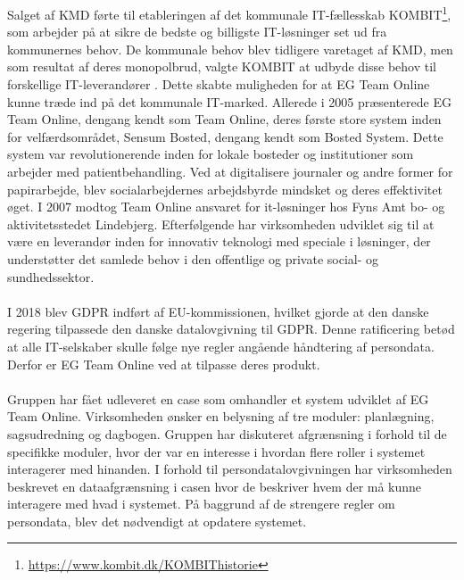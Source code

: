 Salget af KMD førte til etableringen af det kommunale IT-fællesskab KOMBIT\footnote{\url{ https://www.kombit.dk/KOMBIThistorie}}, som arbejder på at sikre de bedste og billigste IT-løsninger set ud fra kommunernes behov. De kommunale behov blev tidligere varetaget af KMD, men som resultat af deres monopolbrud, valgte KOMBIT at udbyde disse behov til forskellige IT-leverandører . Dette skabte muligheden for at EG Team Online kunne træde ind på det kommunale IT-marked.
Allerede i 2005 præsenterede EG Team Online, dengang kendt som Team Online, deres første store system inden for velfærdsområdet, Sensum Bosted, dengang kendt som Bosted System. Dette system var revolutionerende inden for lokale bosteder og institutioner som arbejder med patientbehandling. Ved at digitalisere journaler og andre former for papirarbejde, blev socialarbejdernes arbejdsbyrde mindsket og deres effektivitet øget. I 2007 modtog Team Online ansvaret for it-løsninger hos Fyns Amt bo- og aktivitetsstedet Lindebjerg. Efterfølgende har virksomheden udviklet sig til at være en leverandør inden for innovativ teknologi med speciale i løsninger, der understøtter det samlede behov i den offentlige og private social- og sundhedssektor.\\ \\
I 2018 blev GDPR indført af EU-kommissionen, hvilket gjorde at den danske regering tilpassede den danske datalovgivning til GDPR. Denne ratificering betød at alle IT-selskaber skulle følge nye regler angående håndtering af persondata. Derfor er EG Team Online ved at tilpasse deres produkt.\\
\\
Gruppen har fået udleveret en case som omhandler et system udviklet af EG Team Online. Virksomheden ønsker en belysning af tre moduler: planlægning, sagsudredning og dagbogen. Gruppen har diskuteret afgrænsning i forhold til de specifikke moduler, hvor der var en interesse i hvordan flere roller i systemet interagerer med hinanden. I forhold til persondatalovgivningen har virksomheden beskrevet en dataafgrænsning i casen hvor de beskriver hvem der må kunne interagere med hvad i systemet. På baggrund af de strengere regler om persondata, blev det nødvendigt at opdatere systemet.
 


